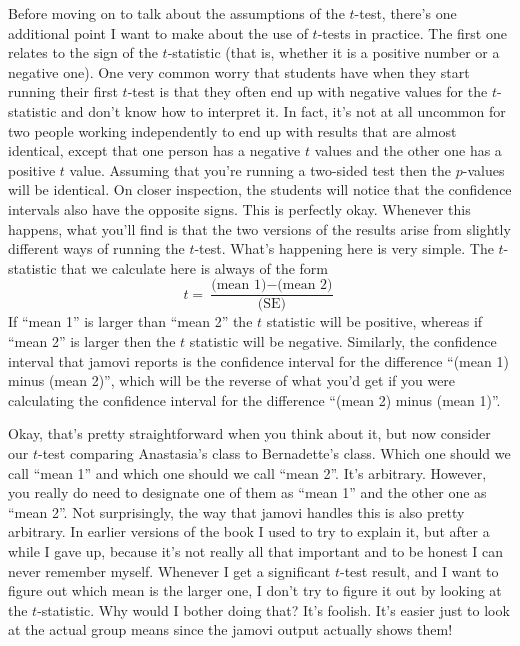 Before moving on to talk about the assumptions of the $t$-test, there's one additional point I want to make about the use of $t$-tests in practice. The first one relates to the sign of the $t$-statistic (that is, whether it is a positive number or a negative one).  One very common worry that students have when they start running their first $t$-test is that they often end up with negative values for the $t$-statistic and don't know how to interpret it. In fact, it's not at all uncommon for two  people working independently to end up with results that are almost identical, except that one person has a negative $t$ values and the other one has a positive $t$ value. Assuming that you're running a two-sided test then the $p$-values will be identical. On closer inspection, the students will notice that the confidence intervals also have the opposite signs. This is perfectly okay. Whenever this happens, what you'll find is that the two versions of the results arise from slightly different ways of running the $t$-test. What's happening here is very simple. The $t$-statistic that we calculate here is always of the form 
$$
t = \frac{\mbox{(mean 1)} -\mbox{(mean 2)}}{ \mbox{(SE)}}
$$
If ``mean 1'' is larger than ``mean 2'' the $t$ statistic will be positive, whereas if ``mean 2'' is larger then the $t$ statistic will be negative. Similarly, the confidence interval that jamovi reports is the confidence interval for the difference ``(mean 1) minus (mean 2)'', which will be the reverse of what you'd get if you were calculating the confidence interval for the difference ``(mean 2) minus (mean 1)''.

Okay, that's pretty straightforward when you think about it, but now consider our $t$-test comparing Anastasia's class to Bernadette's class. Which one should we call ``mean 1'' and which one should we call ``mean 2''. It's arbitrary. However, you really do need to designate one of them as ``mean 1'' and the other one as ``mean 2''. Not surprisingly, the way that jamovi handles this is also pretty arbitrary. In earlier versions of the book I used to try to explain it, but after a while I gave up, because it's not really all that important and to be honest I can never remember myself. Whenever I get a significant $t$-test result, and I want to figure out which mean is the larger one, I don't try to figure it out by looking at the $t$-statistic. Why would I bother doing that? It's foolish. It's easier just to look at the actual group means since the jamovi output actually shows them!

